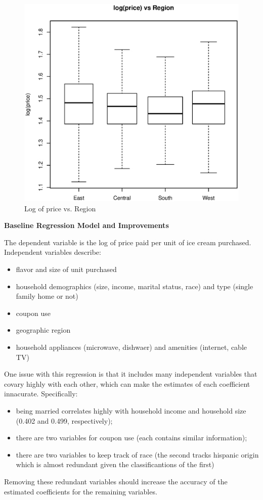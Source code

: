 \documentclass[11pt, fleqn]{article}
\begin{document}
\begin{figure}[!htb]
\centering
\includegraphics[scale=.5]{region.eps}
\caption{Log of price vs. Region}
\label{fig:region}
\end{figure}

\textbf{Baseline Regression Model and Improvements}

The dependent variable is the log of price paid per unit of ice cream purchased. Independent variables describe:
\begin{itemize}
  \item flavor and size of unit purchased
  \item household demographics (size, income, marital status, race) and type (single family home or not)
  \item coupon use
  \item geographic region
  \item household appliances (microwave, dishwaer) and amenities (internet, cable TV)
\end{itemize}

One issue with this regression is that it includes many independent variables that covary highly with each other, which can make the estimates of each coefficient innacurate. Specifically:
\begin{itemize}
  \item being married correlates highly with household income and household size (0.402 and 0.499, respectively);
  \item there are two variables for coupon use (each contains similar information);
  \item there are two variables to keep track of race (the second tracks hispanic origin which is almost redundant given the classificantions of the first)
\end{itemize}
Removing these redundant variables should increase the accuracy of the estimated coefficients for the remaining variables. 
\end{document}
